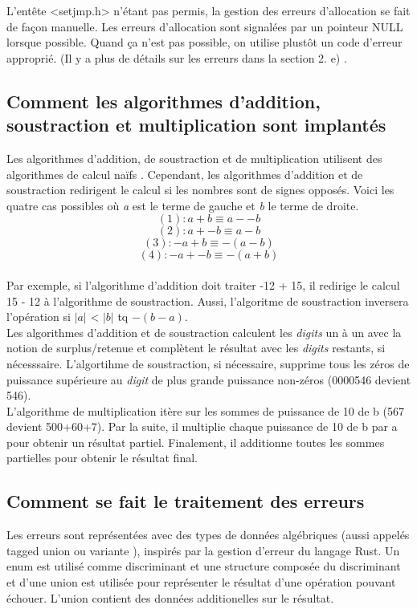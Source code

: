 \documentclass[a4paper,12pt,french]{article}
\begin{document}
		L'entête <setjmp.h> n'étant pas permis, la gestion des erreurs d'allocation se fait de
		façon manuelle. Les erreurs d'allocation sont signalées par un pointeur NULL lorsque
		possible. Quand ça n'est pas possible, on utilise plustôt un code d'erreur approprié.
		(Il y a plus de détails sur les erreurs dans la section 2. e) .\\
	\subsection{Comment les algorithmes d’addition, soustraction et multiplication sont implantés}
		Les algorithmes d'addition, de soustraction et de multiplication utilisent des algorithmes de calcul \og naïfs \fg{}.
		Cependant, les algorithmes d'addition et de soustraction redirigent le calcul si les nombres sont de signes opposés. Voici les quatre cas possibles où \textit{a} est le terme de gauche et \textit{b} le terme de droite.
		\[ (1) : a + b \equiv a - -b\]
		\[ (2) : a + -b \equiv a - b  \]
		\[ (3) : -a + b \equiv -(a-b) \]
		\[ (4) : -a + -b \equiv -(a+b) \]
		\\Par exemple, si l'algorithme d'addition doit traiter -12 + 15, il redirige le calcul 15 - 12 à l'algorithme de soustraction. Aussi, l'algoritme de soustraction inversera l'opération si $|a|$ < $|b|$ tq $-(b-a)$.\\

		Les algorithmes d'addition et de soustraction calculent les \textit{digits} un à un avec la notion de surplus/retenue et complètent le résultat avec les \textit{digits} restants, si nécesssaire. L'algortihme de soustraction, si nécessaire, supprime tous les zéros de puissance supérieure au \textit{digit} de plus grande puissance non-zéros (0000546 devient 546).\\

		L'algorithme de multiplication itère sur les sommes de puissance de 10 de b (567 devient 500+60+7). Par la suite, il multiplie chaque puissance de 10 de b par a pour obtenir un résultat partiel. Finalement, il additionne toutes les sommes partielles pour obtenir le résultat final.
	\subsection{Comment se fait le traitement des erreurs}
		Les erreurs sont représentées avec des types de données algébriques (aussi appelés  \og tagged union \fg{}
		ou \og variante \fg{}), inspirés par la gestion d'erreur du langage Rust. Un enum est utilisé comme
		discriminant et une structure composée du discriminant et d'une union est utilisée pour représenter
		le résultat d'une opération pouvant échouer. L'union contient des données additionelles sur le
		résultat.\\
\end{document}
